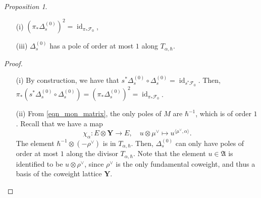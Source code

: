 \documentclass[a4paper]{report}
\theoremstyle{theorem}
\theoremstyle{definition}
\theoremstyle{remark}
\theoremstyle{proposition}
\newtheorem{proposition}{Proposition}
\theoremstyle{conjecture}
\theoremstyle{lemma}
\theoremstyle{corollary}
\theoremstyle{exercise}
\theoremstyle{example}
\newcommand{\mcal}{\mathcal}
\newcommand{\on}{\operatorname}
\begin{document}
  \begin{proposition}
      \leavevmode
      \begin{itemize}
          \item[(i)] $\left(\pi_\ast\Delta_s^{(0)}\right)^2 = \on{id}_{\pi_\ast\mcal{F}_0}$,
          \item[(iii)] $\Delta_s^{(0)}$ has a pole of order at most $1$ along $T_{\alpha,\hbar}$.
      \end{itemize}
  \end{proposition}
  \begin{proof}
      \leavevmode
      \begin{itemize}
          \item[(i)] By construction, we have that $s^\ast\Delta_s^{(0)} \circ \Delta_s^{(0)} = \on{id}_{s^\ast\mcal{F}_0}$.
          Then, $\pi_\ast (s^\ast\Delta_s^{(0)} \circ \Delta_s^{(0)}) = \left(\pi_\ast \Delta_s^{(0)}\right)^2 = \on{id}_{\pi_\ast\mcal{F}_0}$.
          \item[(ii)] 
          From \eqref{eqn_mon_matrix}, the only poles of $M$ are $\hbar^{-1}$, which is of order $1$.
          Recall that we have a map 
          $$\chi_\alpha : E \otimes \mathbf{Y} \longrightarrow E,\quad u \otimes \mu^\vee \longmapsto u^{\langle \mu^\vee,\alpha \rangle}.$$
          The element $\hbar^{-1} \otimes (-\rho^\vee)$ is in $T_{\alpha,\hbar}$. Then, $\Delta_s^{(0)}$ 
          can only have poles of order at most $1$ along the divisor $T_{\alpha,\hbar}$.
          Note that the element $u\in \mathfrak{A}$ is identified to be $u \otimes \rho^\vee$, since 
          $\rho^\vee$ is the only fundamental coweight, and thus a basis of the coweight lattice $\mathbf{Y}$.
      \end{itemize}
  \end{proof}
  
\end{document}
